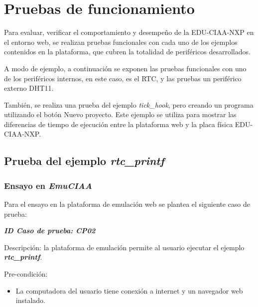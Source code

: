 \section{Pruebas de funcionamiento}  
\label{sec:Pruebas de funcionamiento}

Para evaluar, verificar el comportamiento y desempeño de la EDU-CIAA-NXP en el entorno web, se realizan pruebas funcionales con cada uno de los ejemplos contenidos en la plataforma, que cubren la totalidad de periféricos desarrollados.

A modo de ejemplo, a continuación se exponen las pruebas funcionales con uno de los periféricos internos, en este caso, es el RTC, y las pruebas un periférico externo DHT11.

También, se realiza una prueba del ejemplo \textit{tick\_hook}, pero creando un programa utilizando el botón \textquotedbl Nuevo proyecto\textquotedbl. Este ejemplo se utiliza para mostrar las diferencias de tiempo de ejecución entre la plataforma web y la placa física EDU-CIAA-NXP.

\subsection{ Prueba del ejemplo \textit{\textbf{rtc\_printf}}}

\subsubsection{Ensayo en \textit{EmuCIAA}} 

Para el ensayo en la plataforma de emulación web se plantea el siguiente caso de prueba:

\textit{\textbf{ID Caso de prueba: CP02}}

Descripción: la plataforma de emulación permite al usuario ejecutar el ejemplo \textit{\textbf{rtc\_printf}}.

Pre-condición: 
\begin{itemize}
    \item La computadora del usuario tiene conexión a internet y un navegador web instalado.
\end{itemize}


